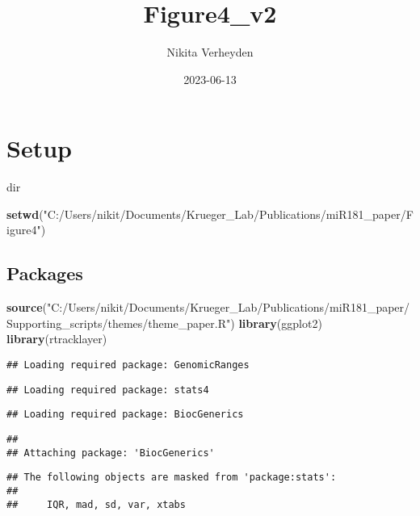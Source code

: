 \documentclass[
]{article}
\title{Figure4\_v2}
\author{Nikita Verheyden}
\date{2023-06-13}
\newenvironment{Shaded}{\begin{snugshade}}{\end{snugshade}}
\newcommand{\FunctionTok}[1]{\textcolor[rgb]{0.13,0.29,0.53}{\textbf{#1}}}
\newcommand{\NormalTok}[1]{#1}
\newcommand{\StringTok}[1]{\textcolor[rgb]{0.31,0.60,0.02}{#1}}
\begin{document}
\maketitle

\hypertarget{setup}{%
\section{Setup}\label{setup}}

dir

\begin{Shaded}
\begin{Highlighting}[]
\FunctionTok{setwd}\NormalTok{(}\StringTok{"C:/Users/nikit/Documents/Krueger\_Lab/Publications/miR181\_paper/Figure4"}\NormalTok{)}
\end{Highlighting}
\end{Shaded}

\hypertarget{packages}{%
\subsection{Packages}\label{packages}}

\begin{Shaded}
\begin{Highlighting}[]
\FunctionTok{source}\NormalTok{(}\StringTok{"C:/Users/nikit/Documents/Krueger\_Lab/Publications/miR181\_paper/Supporting\_scripts/themes/theme\_paper.R"}\NormalTok{)}
\FunctionTok{library}\NormalTok{(ggplot2)}
\FunctionTok{library}\NormalTok{(rtracklayer)}
\end{Highlighting}
\end{Shaded}

\begin{verbatim}
## Loading required package: GenomicRanges
\end{verbatim}

\begin{verbatim}
## Loading required package: stats4
\end{verbatim}

\begin{verbatim}
## Loading required package: BiocGenerics
\end{verbatim}

\begin{verbatim}
## 
## Attaching package: 'BiocGenerics'
\end{verbatim}

\begin{verbatim}
## The following objects are masked from 'package:stats':
## 
##     IQR, mad, sd, var, xtabs
\end{verbatim}
\end{document}
